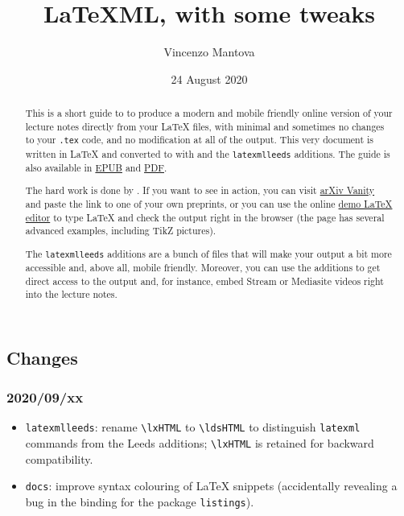 \documentclass[a4paper]{article}
\title{LaTeXML, with some tweaks}
\author{Vincenzo Mantova}
\date{24 August 2020}
\def\ltxinline{\lstinline[style=latexml]}
\theoremstyle{definition}
\begin{document}
\maketitle

\begin{abstract}
  This is a short guide to \LaTeXML{} to produce a modern and mobile friendly online version of your lecture notes directly from your \LaTeX{} files, with minimal and sometimes no changes to your \verb|.tex| code, and no modification at all of the \HTML{} output. This very document is written in \LaTeX{} and converted to \HTML{} with \LaTeXML{} and the \verb|latexmlleeds| additions. The guide is also available in \href{LaTeXML-Leeds.epub}{EPUB} and \href{LaTeXML-Leeds.pdf}{PDF}.

  The hard work is done by \LaTeXML{}. If you want to see \LaTeXML{} in action, you can visit \href{https://www.arxiv-vanity.com/}{arXiv Vanity} and paste the link to one of your own preprints, or you can use the online \href{https://latexml.mathweb.org/editor}{demo \LaTeX{} editor} to type \LaTeX{} and check the \HTML{} output right in the browser (the page has several advanced examples, including TikZ pictures).

  The \verb|latexmlleeds| additions are a bunch of files that will make your output a bit more accessible and, above all, mobile friendly. Moreover, you can use the additions to get direct access to the \HTML{} output and, for instance, embed Stream or Mediasite videos right into the lecture notes.
\end{abstract}

\subsection*{Changes}
\subsubsection*{2020/09/xx}
\begin{itemize}
  \item \verb|latexmlleeds|: rename \ltxinline{\lxHTML} to \ltxinline{\ldsHTML} to distinguish \verb|latexml| commands from the Leeds additions; \ltxinline{\lxHTML} is retained for backward compatibility.
  \item \verb|docs|: improve syntax colouring of \LaTeX{} snippets (accidentally revealing a bug in the \LaTeXML{} binding for the package \verb|listings|).
\end{itemize}
\end{document}
